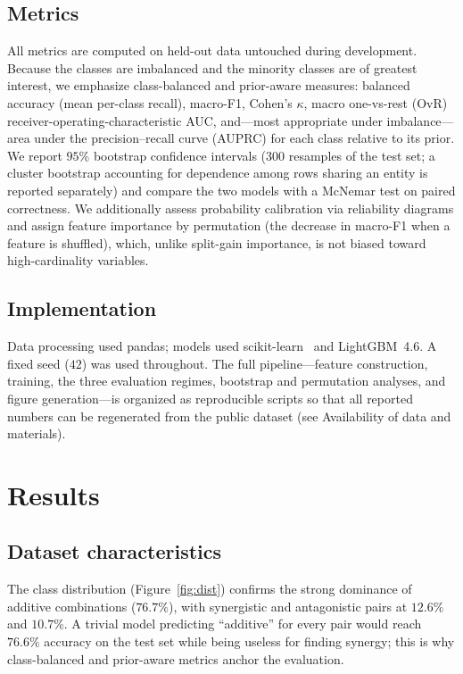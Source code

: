 \documentclass[11pt]{article}
\begin{document}
\subsection{Metrics}
All metrics are computed on held-out data untouched during development. Because the classes are
imbalanced and the minority classes are of greatest interest, we emphasize class-balanced and
prior-aware measures: balanced accuracy (mean per-class recall), macro-F1, Cohen's $\kappa$, macro
one-vs-rest (OvR) receiver-operating-characteristic AUC, and---most appropriate under imbalance---area
under the precision--recall curve (AUPRC) for each class relative to its prior. We report $95\%$
bootstrap confidence intervals ($300$ resamples of the test set; a cluster bootstrap accounting for
dependence among rows sharing an entity is reported separately) and compare the two models with a
McNemar test on paired correctness. We additionally assess probability calibration via reliability
diagrams and assign feature importance by permutation (the decrease in macro-F1 when a feature is
shuffled), which, unlike split-gain importance, is not biased toward high-cardinality variables.

\subsection{Implementation}
Data processing used pandas; models used scikit-learn~\cite{pedregosa2011} and LightGBM~4.6. A fixed
seed ($42$) was used throughout. The full pipeline---feature construction, training, the three
evaluation regimes, bootstrap and permutation analyses, and figure generation---is organized as
reproducible scripts so that all reported numbers can be regenerated from the public dataset (see
Availability of data and materials).

\section{Results}

\subsection{Dataset characteristics}
The class distribution (Figure~\ref{fig:dist}) confirms the strong dominance of additive combinations
($76.7\%$), with synergistic and antagonistic pairs at $12.6\%$ and $10.7\%$. A trivial model
predicting ``additive'' for every pair would reach $76.6\%$ accuracy on the test set while being
useless for finding synergy; this is why class-balanced and prior-aware metrics anchor the evaluation.
\end{document}
